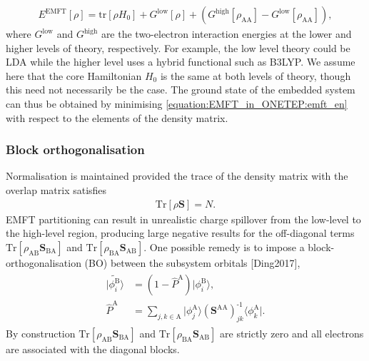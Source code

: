 \documentclass[letterpaper,10pt,english]{sphinxmanual}
\begin{document}
\label{\detokenize{EMFT_in_ONETEP:equation-emft-en}}\begin{equation}\label{equation:EMFT_in_ONETEP:emft_en}
\begin{split}E^\text{EMFT}{\left[\rho\right]}=
        \text{tr}{\left[\rho H_0\right]}+G^\text{low}{\left[\rho\right]}+\left(G^\text{high}{\left[\rho_\text{AA}\right]}-G^\text{low}{\left[\rho_\text{AA}\right]}\right),\end{split}
\end{equation}
where \(G^\text{low}\) and \(G^\text{high}\) are the
two-electron interaction energies at the lower and higher levels of
theory, respectively. For example, the low level theory could be LDA
while the higher level uses a hybrid functional such as B3LYP. We assume
here that the core Hamiltonian \(H_0\) is the same at both levels of
theory, though this need not necessarily be the case. The ground state
of the embedded system can thus be obtained by minimising
\eqref{equation:EMFT_in_ONETEP:emft_en} with respect to the elements of the density
matrix.


\subsubsection{Block orthogonalisation}
\label{\detokenize{EMFT_in_ONETEP:block-orthogonalisation}}
Normalisation is maintained provided the trace of the density matrix
with the overlap matrix satisfies
\begin{equation*}
\begin{split}\text{Tr}\left[\rho\textbf{S}\right]=N.\end{split}
\end{equation*}
EMFT partitioning can result in unrealistic charge spillover from the
low-level to the high-level region, producing large negative results for
the off-diagonal terms
\(\text{Tr}\left[\rho_\text{AB}\textbf{S}_\text{BA}\right]\) and
\(\text{Tr}\left[\rho_\text{BA}\textbf{S}_\text{AB}\right]\). One
possible remedy is to impose a block-orthogonalisation (BO) between the
subsystem orbitals {[}Ding2017{]},
\begin{equation*}
\begin{split}\begin{aligned}
    {\lvert\tilde{\phi_i^\text{B}}\rangle}&
        =\left(1-\hat{P}^\text{A}\right){\lvert\phi_i^\text{B}\rangle}, \\
    \hat{P}^\text{A}&
        =\sum_{j,k\in\text{A}}{\lvert\phi_j^\text{A}\rangle}
        \left(\textbf{S}^\text{AA}\right)_{jk}^\text{-1}{\langle\phi_k^\text{A}\rvert}.\end{aligned}\end{split}
\end{equation*}
By construction
\(\text{Tr}\left[\rho_\text{AB}\textbf{S}_\text{BA}\right]\) and
\(\text{Tr}\left[\rho_\text{BA}\textbf{S}_\text{AB}\right]\) are
strictly zero and all electrons are associated with the diagonal blocks.
\end{document}
